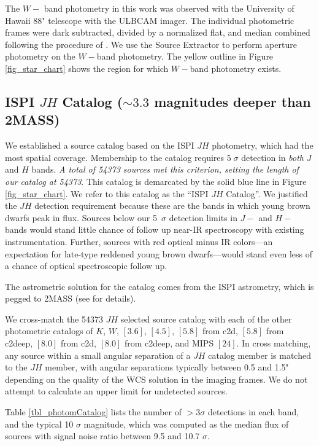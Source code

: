 The $W-$ band photometry in this work was observed with the University of Hawaii 88" telescope with the ULBCAM imager.  The individual photometric frames were dark subtracted, divided by a normalized flat, and median combined following the procedure of \cite{allers06}.  We use the Source Extractor \citep{1996A&AS..117..393B} to perform aperture photometry on the $W-$band photometry.  The yellow outline in Figure \ref{fig_star_chart} shows the region for which $W-$band photometry exists.



\subsection{ISPI $JH$ Catalog ($\sim3.3$ magnitudes deeper than 2MASS)}
We established a source catalog based on the ISPI $JH$ photometry, which had the most spatial coverage.  Membership to the catalog requires $5\; \sigma$ detection in \emph{both} $J$ and $H$ bands.  \emph{A total of 54373 sources met this criterion, setting the length of our catalog at 54373}.  This catalog is demarcated by the solid blue line in Figure \ref{fig_star_chart}.  We refer to this catalog as the ``ISPI $JH$ Catalog''.  We justified the $JH$ detection requirement because these are the bands in which young brown dwarfs peak in flux.   Sources below our 5~$\sigma$ detection limits in $J-$ and $H-$ bands would stand little chance of follow up near-IR spectroscopy with existing instrumentation.  Further, sources with red optical minus IR colors---an expectation for late-type reddened young brown dwarfs---would stand even less of a chance of optical spectroscopic follow up.  

The astrometric solution for the catalog comes from the ISPI astrometry, which is pegged to 2MASS (see \citet{allers06} for details).

We cross-match the 54373 $JH$ selected source catalog with each of the other photometric catalogs of $K$, $W$, $[3.6]$, $[4.5]$, $[5.8]$ from c2d, $[5.8]$ from c2deep, $[8.0]$ from c2d, $[8.0]$ from c2deep, and MIPS $[24]$. In cross matching, any source within a small angular separation of a $JH$ catalog member is matched to the $JH$ member, with angular separations typically between 0.5 and 1.5" depending on the quality of the WCS solution in the imaging frames.  We do not attempt to calculate an upper limit for undetected sources.

Table \ref{tbl_photomCatalog} lists the number of $>3\sigma$ detections in each band, and the typical 10 $\sigma$ magnitude, which was computed as the median flux of sources with signal noise ratio between 9.5 and 10.7 $\sigma$.

